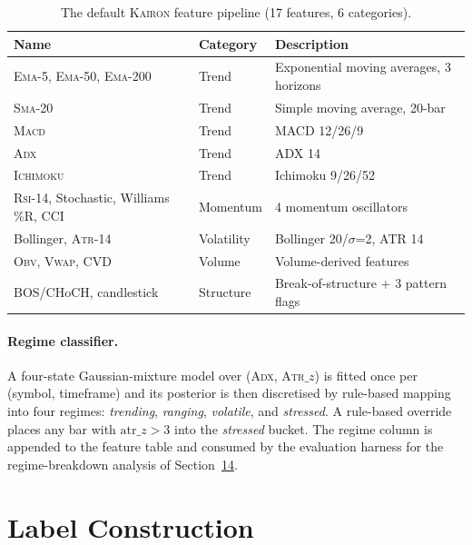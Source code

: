 \documentclass[11pt,a4paper]{article}
\let\oldsection\section
\renewcommand{\section}{\clearpage\oldsection}
\providecommand{\kairon}{\textsc{Kairon}}
\providecommand{\vwap}{\textsc{Vwap}}
\providecommand{\obv}{\textsc{Obv}}
\providecommand{\ichimoku}{\textsc{Ichimoku}}
\providecommand{\ema}{\textsc{Ema}}
\providecommand{\sma}{\textsc{Sma}}
\providecommand{\macd}{\textsc{Macd}}
\providecommand{\adx}{\textsc{Adx}}
\providecommand{\atr}{\textsc{Atr}}
\providecommand{\rsi}{\textsc{Rsi}}
\begin{document}
\begin{table}[htbp]
\centering
\small
\caption{The default \kairon{} feature pipeline (17 features,
6 categories).}
\label{tab:features}
\begin{tabularx}{\linewidth}{@{}lXl@{}}
\toprule
\textbf{Name} & \textbf{Category} & \textbf{Description}\\
\midrule
\ema{}-5, \ema{}-50, \ema{}-200         & Trend      & Exponential moving averages, 3 horizons\\
\sma{}-20                                & Trend      & Simple moving average, 20-bar\\
\macd{}                                  & Trend      & MACD 12/26/9\\
\adx{}                                   & Trend      & ADX 14\\
\ichimoku{}                              & Trend      & Ichimoku 9/26/52\\
\rsi{}-14, Stochastic, Williams\,\%R, CCI & Momentum   & 4 momentum oscillators\\
Bollinger, \atr{}-14                     & Volatility & Bollinger 20/$\sigma$=2, ATR 14\\
\obv{}, \vwap{}, CVD                     & Volume     & Volume-derived features\\
BOS/CHoCH, candlestick                   & Structure  & Break-of-structure + 3 pattern flags\\
\bottomrule
\end{tabularx}
\end{table}

\paragraph{Regime classifier.}
A four-state Gaussian-mixture model over
(\adx{}, \atr{}$\_z$) is fitted once per (symbol, timeframe) and
its posterior is then discretised by rule-based mapping into
four regimes: \emph{trending}, \emph{ranging}, \emph{volatile},
and \emph{stressed}. A rule-based override places any bar with
$\text{atr}\_z > 3$ into the \emph{stressed} bucket. The regime
column is appended to the feature table and consumed by the
evaluation harness for the regime-breakdown analysis of
Section~\hyperref[sec:exp]{14}.

\section{Label Construction}\label{sec:lab}
\end{document}
